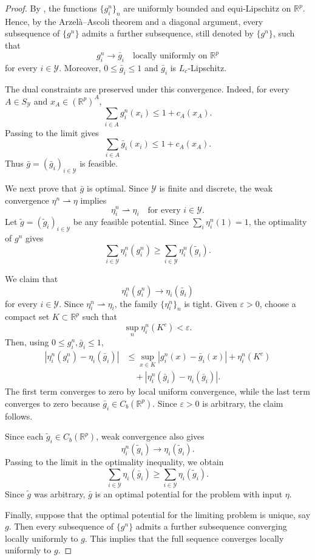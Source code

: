 \documentclass{amsart}
\theoremstyle{plain}
\numberwithin{equation}{section}\newtheorem{theorem}{Theorem}[section]
\theoremstyle{remark}
\begin{document}
\begin{proof}
By , the functions
$\{g_i^n\}_n$ are uniformly bounded and equi-Lipschitz on
$\mathbb R^p$. Hence, by the Arzelà--Ascoli theorem and a diagonal
argument, every subsequence of $\{g^n\}$ admits a further subsequence,
still denoted by $\{g^n\}$, such that
\[
    g_i^n\longrightarrow\bar g_i
    \quad
    \text{locally uniformly on }\mathbb R^p
\]
for every $i\in\mathcal Y$. Moreover,
$0\leq\bar g_i\leq1$ and $\bar g_i$ is $L_c$-Lipschitz.

The dual constraints are preserved under this convergence. Indeed, for
every $A\in S_{\mathcal Y}$ and
$x_A\in(\mathbb R^p)^A$,
\[
    \sum_{i\in A}g_i^n(x_i)
    \leq
    1+c_A(x_A).
\]
Passing to the limit gives
\[
    \sum_{i\in A}\bar g_i(x_i)
    \leq
    1+c_A(x_A).
\]
Thus $\bar g=(\bar g_i)_{i\in\mathcal Y}$ is feasible.

We next prove that $\bar g$ is optimal. Since $\mathcal Y$ is finite
and discrete, the weak convergence $\eta^n\rightharpoonup\eta$
implies
\[
    \eta_i^n\rightharpoonup\eta_i
    \quad
    \text{for every }i\in\mathcal Y.
\]
Let
$\widetilde g=(\widetilde g_i)_{i\in\mathcal Y}$ be any feasible
potential. Since $\sum_i\eta_i^n(1)=1$, the optimality of $g^n$ gives
\[
    \sum_{i\in\mathcal Y}\eta_i^n(g_i^n)
    \geq
    \sum_{i\in\mathcal Y}\eta_i^n(\widetilde g_i).
\]

We claim that
\[
    \eta_i^n(g_i^n)
    \longrightarrow
    \eta_i(\bar g_i)
\]
for every $i\in\mathcal Y$. Since
$\eta_i^n\rightharpoonup\eta_i$, the family
$\{\eta_i^n\}_n$ is tight. Given $\varepsilon>0$, choose a compact set
$K\subset\mathbb R^p$ such that
\[
    \sup_n\eta_i^n(K^c)<\varepsilon.
\]
Then, using $0\leq g_i^n,\bar g_i\leq1$,
\begin{align*}
    \left|
        \eta_i^n(g_i^n)-\eta_i(\bar g_i)
    \right|
    &\leq
    \sup_{x\in K}|g_i^n(x)-\bar g_i(x)|
    +\eta_i^n(K^c) \\
    &\quad
    +
    \left|
        \eta_i^n(\bar g_i)-\eta_i(\bar g_i)
    \right|.
\end{align*}
The first term converges to zero by local uniform convergence, while
the last term converges to zero because
$\bar g_i\in C_b(\mathbb R^p)$. Since $\varepsilon>0$ is arbitrary,
the claim follows.

Since each $\widetilde g_i\in C_b(\mathbb R^p)$, weak convergence also
gives
\[
    \eta_i^n(\widetilde g_i)
    \longrightarrow
    \eta_i(\widetilde g_i).
\]
Passing to the limit in the optimality inequality, we obtain
\[
    \sum_{i\in\mathcal Y}\eta_i(\bar g_i)
    \geq
    \sum_{i\in\mathcal Y}\eta_i(\widetilde g_i).
\]
Since $\widetilde g$ was arbitrary, $\bar g$ is an optimal potential
for the problem with input $\eta$.

Finally, suppose that the optimal potential for the limiting problem is
unique, say $g$. Then every subsequence of $\{g^n\}$ admits a further
subsequence converging locally uniformly to $g$. This implies that
the full sequence converges locally uniformly to $g$.
\end{proof}
\end{document}
